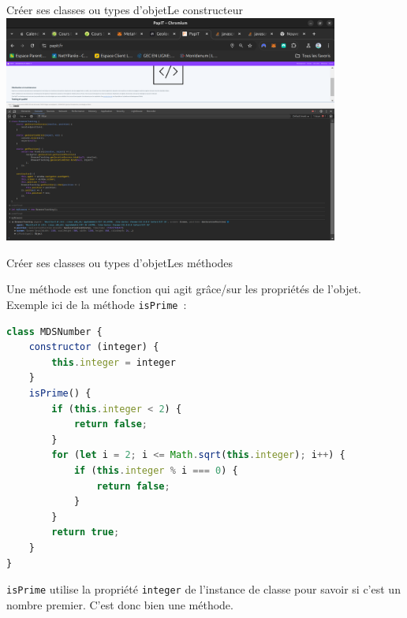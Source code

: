 \documentclass{beamer}
\begin{document}
    \begin{frame}{Créer ses classes ou types d'objet}{Le constructeur}
        \centering
        \includegraphics[width=11cm]{image/browser-tracker}
    \end{frame}


    \begin{frame}[fragile]{Créer ses classes ou types d'objet}{Les méthodes}
        \begin{footnotesize}
            Une méthode est une fonction qui agit grâce/sur les propriétés de l'objet.
            Exemple ici de la méthode \lstinline{isPrime}~:
            \begin{lstlisting}[language=JavaScript,title={\tiny{Script JavaScript}},basicstyle=\tiny\ttfamily]
class MDSNumber {
    constructor (integer) {
        this.integer = integer
    }
    isPrime() {
        if (this.integer < 2) {
            return false;
        }
        for (let i = 2; i <= Math.sqrt(this.integer); i++) {
            if (this.integer % i === 0) {
                return false;
            }
        }
        return true;
    }
}
            \end{lstlisting}
            \lstinline{isPrime} utilise la propriété \lstinline{integer} de l'instance de classe pour savoir si c'est un nombre premier.
            C'est donc bien une méthode.
        \end{footnotesize}
    \end{frame}
\end{document}
